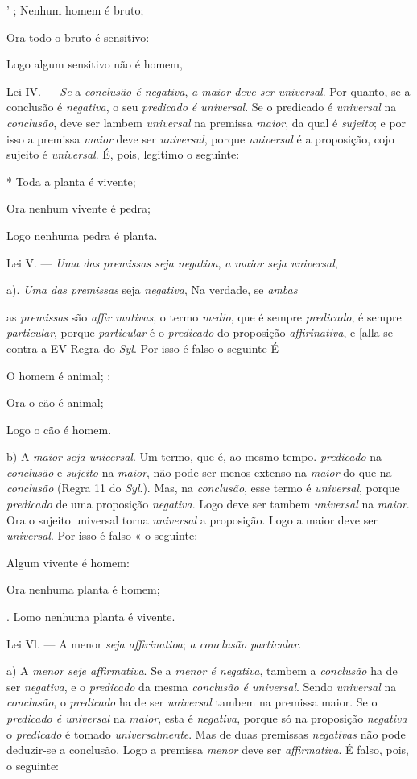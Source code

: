 ' ; Nenhum homem é bruto;

Ora todo o bruto é sensitivo:

Logo algum sensitivo não é homem,

Lei IV. --- \emph{Se} a \emph{conclusão é negativa}, \emph{a maior deve ser universal}. Por quanto, se a conclusão é \emph{negativa}, o seu \emph{predicado é universal}. Se o predicado é \emph{universal} na \emph{conclusão}, deve ser lambem \emph{universal} na premissa \emph{maior}, da qual é \emph{sujeito}; e por isso a premissa \emph{maior} deve ser \emph{universul}, porque \emph{universal} é a proposição, cojo sujeito é \emph{universal}. É, pois, legitimo o seguinte:

* Toda a planta é vivente;

Ora nenhum vivente é pedra;

Logo nenhuma pedra é planta.

Lei V. --- \emph{Uma das premissas seja negativa}, \emph{a maior seja universal},

a). \emph{Uma das premissas} seja \emph{negativa}, Na verdade, se \emph{ambas}

as \emph{premissas} são \emph{affir mativas}, o termo \emph{medio}, que é sempre \emph{predicado}, é sempre \emph{particular}, porque \emph{particular} é o \emph{predicado} do proposição \emph{affirinativa}, e [alla-se contra a EV Regra do \emph{Syl}. Por isso é falso o seguinte É

O homem é animal; :

Ora o cão é animal;

Logo o cão é homem.

b) A \emph{maior seja unicersal}. Um termo, que é, ao mesmo tempo. \emph{predicado} na \emph{conclusão} e \emph{sujeito} na \emph{maior}, não pode ser menos extenso na \emph{maior} do que na \emph{conclusão} (Regra 11 do \emph{Syl}.). Mas, na \emph{conclusão}, esse termo é \emph{universal}, porque \emph{predicado} de uma proposição \emph{negativa}. Logo deve ser tambem \emph{universal} na \emph{maior}. Ora o sujeito universal torna \emph{universal} a proposição. Logo a maior deve ser \emph{universal}. Por isso é falso « o seguinte:

Algum vivente é homem:

Ora nenhuma planta é homem;

. Lomo nenhuma planta é vivente.

Lei Vl. --- A menor \emph{seja affirinatioa}; \emph{a conclusão particular}.

a) A \emph{menor seje affirmativa}. Se a \emph{menor é negativa}, tambem a \emph{conclusão} ha de ser \emph{negativa}, e o \emph{predicado} da mesma \emph{conclusão é universal}. Sendo \emph{universal} na \emph{conclusão}, o \emph{predicado} ha de ser \emph{universal} tambem na premissa maior. Se o \emph{predicado é universal} na \emph{maior}, esta é \emph{negativa}, porque só na proposição \emph{negativa} o \emph{predicado} é tomado \emph{universalmente}. Mas de duas premissas \emph{negativas} não pode deduzir-se a conclusão. Logo a premissa \emph{menor} deve ser \emph{affirmativa}. É falso, pois, o seguinte:

